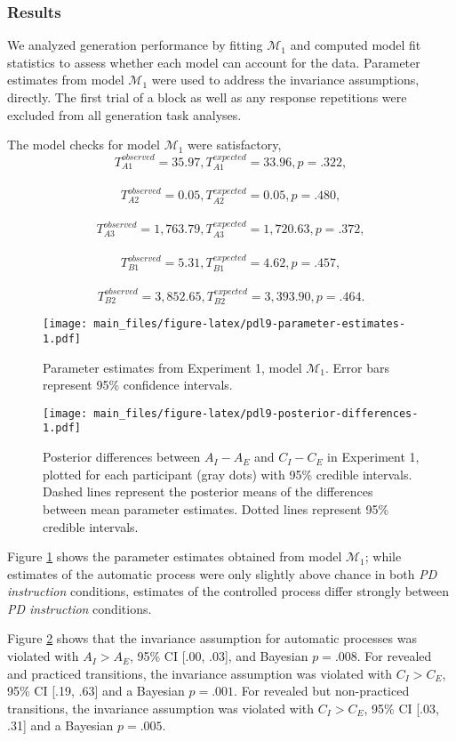 \documentclass[english,,man]{apa6}
\begin{document}
\begin{appendix}
\hypertarget{results}{%
\subsubsection{Results}\label{results}}

We analyzed generation performance by fitting \(\mathcal{M}_1\) and
computed model fit statistics to assess whether each model can account
for the data. Parameter estimates from model \(\mathcal{M}_1\) were used
to address the invariance assumptions, directly. The first trial of a
block as well as any response repetitions were excluded from all
generation task analyses.

The model checks for model \(\mathcal{M}_1\) were satisfactory,
\[T_{A1}^{observed} = 35.97, T_{A1}^{expected} = 33.96, p = .322,\]~
\[T_{A2}^{observed} = 0.05, T_{A2}^{expected} = 0.05, p = .480,\]~
\[T_{A3}^{observed} = 1,763.79, T_{A3}^{expected} = 1,720.63, p = .372,\]~
\[T_{B1}^{observed} = 5.31, T_{B1}^{expected} = 4.62, p = .457,\]~
\[T_{B2}^{observed} = 3,852.65, T_{B2}^{expected} = 3,393.90, p = .464.\]

\begin{figure}
\centering
\texttt{[image: main\_files/figure-latex/pdl9-parameter-estimates-1.pdf]}
\caption{\label{fig:pdl9-parameter-estimates}Parameter estimates from
Experiment 1, model \(\mathcal{M}_1\). Error bars represent 95\%
confidence intervals.}
\end{figure}

\begin{figure}
\centering
\texttt{[image: main\_files/figure-latex/pdl9-posterior-differences-1.pdf]}
\caption{\label{fig:pdl9-posterior-differences}Posterior differences between
\(A_I - A_E\) and \(C_I - C_E\) in Experiment 1, plotted for each
participant (gray dots) with 95\% credible intervals. Dashed lines
represent the posterior means of the differences between mean parameter
estimates. Dotted lines represent 95\% credible intervals.}
\end{figure}

Figure \ref{fig:pdl9-parameter-estimates} shows the parameter estimates
obtained from model \(\mathcal{M}_1\); while estimates of the automatic
process were only slightly above chance in both \emph{PD instruction}
conditions, estimates of the controlled process differ strongly between
\emph{PD instruction} conditions.

Figure \ref{fig:pdl9-posterior-differences} shows that the invariance
assumption for automatic processes was violated with \(A_I > A_E\), 95\%
CI {[}.00, .03{]}, and Bayesian \(p = .008\). For revealed and practiced
transitions, the invariance assumption was violated with \(C_I > C_E\),
95\% CI {[}.19, .63{]} and a Bayesian \(p = .001\). For revealed but
non-practiced transitions, the invariance assumption was violated with
\(C_I > C_E\), 95\% CI {[}.03, .31{]} and a Bayesian \(p = .005\).


\end{appendix}
\end{document}
